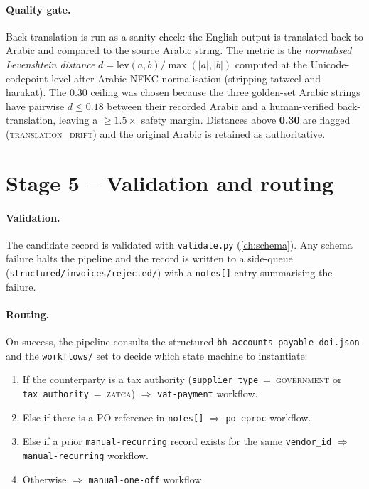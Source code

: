 \documentclass[11pt,a4paper,twoside]{report}
\begin{document}
\paragraph{Quality gate.} Back-translation is run as a sanity check:
the English output is translated back to Arabic and compared to the
source Arabic string. The metric is the \emph{normalised Levenshtein
distance} $d = \mathrm{lev}(a, b) / \max(|a|, |b|)$ computed at the
Unicode-codepoint level after Arabic NFKC normalisation (stripping
tatweel and harakat). The 0.30 ceiling was chosen because the three
golden-set Arabic strings have pairwise $d \leq 0.18$ between their
recorded Arabic and a human-verified back-translation, leaving a
$\geq 1.5\times$ safety margin. Distances above \textbf{0.30} are
flagged (\textsc{translation\_drift}) and the original Arabic is
retained as authoritative.

\section{Stage 5 -- Validation and routing}

\paragraph{Validation.} The candidate record is validated with
\texttt{validate.py} (\cref{ch:schema}). Any schema failure halts the
pipeline and the record is written to a side-queue
(\texttt{structured/invoices/rejected/}) with a \texttt{notes[]} entry
summarising the failure.

\paragraph{Routing.} On success, the pipeline consults the structured
\texttt{bh-accounts-payable-doi.json} and the \texttt{workflows/} set
to decide which state machine to instantiate:

\begin{enumerate}
\item If the counterparty is a tax authority
(\texttt{supplier\_type}~=~\textsc{government} or
\texttt{tax\_authority}~=~\textsc{zatca})
$\Rightarrow$ \texttt{vat-payment} workflow.
\item Else if there is a PO reference in \texttt{notes[]}
$\Rightarrow$ \texttt{po-eproc} workflow.
\item Else if a prior \texttt{manual-recurring} record exists for
the same \texttt{vendor\_id}
$\Rightarrow$ \texttt{manual-recurring} workflow.
\item Otherwise $\Rightarrow$ \texttt{manual-one-off} workflow.
\end{enumerate}
\end{document}
